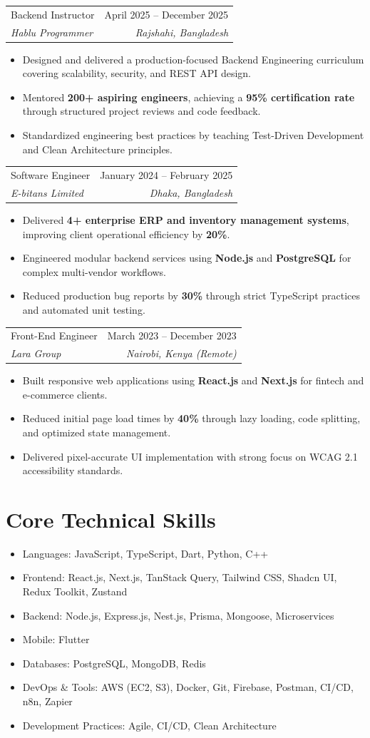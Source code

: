 \documentclass[letterpaper,12pt]{article}
\makeatletter
\newcommand{\semibold}[1]{{\fontseries{sb}\selectfont #1}}
\newcommand{\resumeSubheading}[4]{%
  \vspace{2pt}
  \begin{tabularx}{\linewidth}{@{}X r@{}}
    \semibold{#1} & \semibold{\normalsize #2} \\
    \textit{\normalsize #3} & \textit{\normalsize #4}
  \end{tabularx}
  \vspace{1pt}
}
\newcommand{\resumeItem}[1]{%
  \item #1
}
\newcommand{\skillRow}[2]{%
  \item \semibold{#1:} #2
}
\newenvironment{resumeItemList}{%
  \begin{itemize}[leftmargin=0.18in, label=\textbullet, itemsep=1pt, topsep=1pt, parsep=0pt]
}{%
  \end{itemize}
}
\makeatother
\begin{document}
\resumeSubheading
  {Backend Instructor}{April 2025 -- December 2025}
  {Hablu Programmer}{Rajshahi, Bangladesh}
\begin{resumeItemList}
  \resumeItem{Designed and delivered a production-focused Backend Engineering curriculum covering scalability, security, and REST API design.}
  \resumeItem{Mentored \textbf{200+ aspiring engineers}, achieving a \textbf{95\% certification rate} through structured project reviews and code feedback.}
  \resumeItem{Standardized engineering best practices by teaching Test-Driven Development and Clean Architecture principles.}
\end{resumeItemList}

\resumeSubheading
  {Software Engineer}{January 2024 -- February 2025}
  {E-bitans Limited}{Dhaka, Bangladesh}
\begin{resumeItemList}
  \resumeItem{Delivered \textbf{4+ enterprise ERP and inventory management systems}, improving client operational efficiency by \textbf{20\%}.}
  \resumeItem{Engineered modular backend services using \textbf{Node.js} and \textbf{PostgreSQL} for complex multi-vendor workflows.}
  \resumeItem{Reduced production bug reports by \textbf{30\%} through strict TypeScript practices and automated unit testing.}
\end{resumeItemList}

\resumeSubheading
  {Front-End Engineer}{March 2023 -- December 2023}
  {Lara Group}{Nairobi, Kenya (Remote)}
\begin{resumeItemList}
  \resumeItem{Built responsive web applications using \textbf{React.js} and \textbf{Next.js} for fintech and e-commerce clients.}
  \resumeItem{Reduced initial page load times by \textbf{40\%} through lazy loading, code splitting, and optimized state management.}
  \resumeItem{Delivered pixel-accurate UI implementation with strong focus on WCAG 2.1 accessibility standards.}
\end{resumeItemList}

\section{Core Technical Skills}
\begin{itemize}[label={}, leftmargin=0in, itemsep=0pt, topsep=0pt]
  \skillRow{Languages}{JavaScript, TypeScript, Dart, Python, C++}
  \skillRow{Frontend}{React.js, Next.js, TanStack Query, Tailwind CSS, Shadcn UI, Redux Toolkit, Zustand}
  \skillRow{Backend}{Node.js, Express.js, Nest.js, Prisma, Mongoose, Microservices}
  \skillRow{Mobile}{Flutter}
  \skillRow{Databases}{PostgreSQL, MongoDB, Redis}
  \skillRow{DevOps \& Tools}{AWS (EC2, S3), Docker, Git, Firebase, Postman, CI/CD, n8n, Zapier}
  \skillRow{Development Practices}{Agile, CI/CD, Clean Architecture}
\end{itemize}
\end{document}

